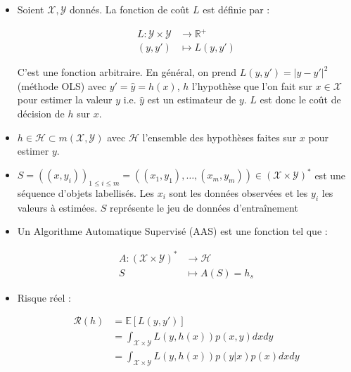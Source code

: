 \begin{itemize}

\item \noindent Soient $\mathcal{X}, \mathcal{Y}$ donnés. La fonction de coût $L$ est définie par : 

\[
\begin{aligned}
    L : \mathcal{Y} \times \mathcal{Y} &\to \mathbb{R}^{+} \\
    (y,y') &\mapsto L(y,y')
\end{aligned}
\]

\noindent C'est une fonction arbitraire. En général, on prend $L(y,y') = |y - y'|^2$ (méthode OLS) avec $y' = \hat{y} = h(x)$, 
$h$ l'hypothèse que l'on fait sur $x \in \mathcal{X}$ pour estimer la valeur $y$ i.e. $\hat{y}$ est un estimateur de $y$. $L$ est donc le coût
de décision de $h$ sur $x$. \newline

\item $h \in \mathcal{H} \subset m(\mathcal{X}, \mathcal{Y})$ avec $\mathcal{H}$ l'ensemble des hypothèses faites sur $x$ pour estimer $y$. \newline

\item $S = ((x,y_i))_{1 \leq i \leq m} = ((x_1,y_1), \dots, (x_m,y_m)) \in (\mathcal{X} \times \mathcal{Y})^{*}$  est une séquence d'objets labellisés.
Les $x_i$ sont les données observées et les $y_i$ les valeurs à estimées. $S$ représente le jeu de données d'entraînement \newline

\item Un Algorithme Automatique Supervisé (AAS) est une fonction tel que : 

\[
\begin{aligned}
A : (\mathcal{X} \times \mathcal{Y})^{*} &\to \mathcal{H} \\
S &\mapsto A(S) = h_s
\end{aligned}
\]

\item Risque réel :

\begin{align}
    \mathcal{R}(h) &= \mathbb{E}[L(y,y')] \\
                   &= \int_{\mathcal{X} \times \mathcal{Y}} L(y, h(x))p(x,y)dxdy \nonumber\\
                   &= \int_{\mathcal{X} \times \mathcal{Y}} L(y, h(x))p(y | x)p(x)dxdy \nonumber
\end{align}



\end{itemize}
